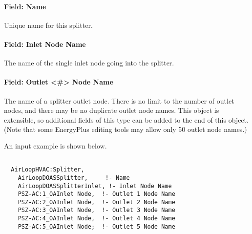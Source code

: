 \paragraph{Field: Name}\label{field-name-4-002}

Unique name for this splitter.

\paragraph{Field: Inlet Node Name}\label{field-inlet-node-name-2}

The name of the single inlet node going into the splitter.

\paragraph{Field: Outlet \textless{}\#\textgreater{} Node Name}\label{field-outlet-node-name-2}

The name of a splitter outlet node. There is no limit to the number of outlet nodes, and there may be no duplicate outlet node names.  This object is extensible, so additional fields of this type can be added to the end of this object.  (Note that some EnergyPlus editing tools may allow only 50 outlet node names.)

An input example is shown below.

\begin{lstlisting}

  AirLoopHVAC:Splitter,
    AirLoopDOASSplitter,     !- Name
    AirLoopDOASSplitterInlet, !- Inlet Node Name
    PSZ-AC:1_OAInlet Node,  !- Outlet 1 Node Name
    PSZ-AC:2_OAInlet Node,  !- Outlet 2 Node Name
    PSZ-AC:3_OAInlet Node,  !- Outlet 3 Node Name
    PSZ-AC:4_OAInlet Node,  !- Outlet 4 Node Name
    PSZ-AC:5_OAInlet Node;  !- Outlet 5 Node Name
\end{lstlisting}
